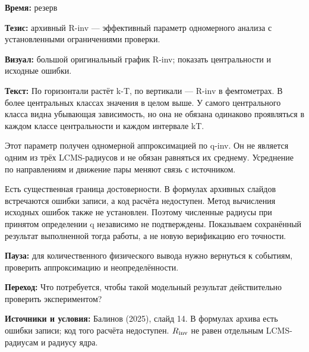 \textbf{Время:} резерв

\textbf{Тезис:} архивный R-inv — эффективный параметр одномерного анализа с установленными ограничениями проверки.

\textbf{Визуал:} большой оригинальный график R-inv; показать центральности и исходные ошибки.

\textbf{Текст:} По горизонтали растёт k-T, по вертикали — R-inv в фемтометрах. В более центральных классах значения в целом выше. У самого центрального класса видна убывающая зависимость, но она не обязана одинаково проявляться в каждом классе центральности и каждом интервале kT.

Этот параметр получен одномерной аппроксимацией по q-inv. Он не является одним из трёх LCMS-радиусов и не обязан равняться их среднему. Усреднение по направлениям и движение пары меняют связь с источником.

Есть существенная граница достоверности. В формулах архивных слайдов встречаются ошибки записи, а код расчёта недоступен. Метод вычисления исходных ошибок также не установлен. Поэтому численные радиусы при принятом определении q независимо не подтверждены. Показываем сохранённый результат выполненной тогда работы, а не новую верификацию его точности.

\textbf{Пауза:} для количественного физического вывода нужно вернуться к событиям, проверить аппроксимацию и неопределённости.

\textbf{Переход:} Что потребуется, чтобы такой модельный результат действительно проверить экспериментом?

\textbf{Источники и условия:} Балинов (2025), слайд 14. В формулах архива есть ошибки записи; код того расчёта недоступен. \(R_{\rm inv}\) не равен отдельным LCMS-радиусам и радиусу ядра.
